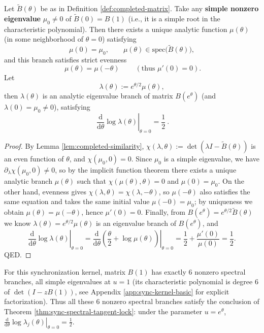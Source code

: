 \begin{theorem}[Spectral Tangent Lock: All Spectral Logarithmic Slopes at \texorpdfstring{$u=1$}{u=1} Are Identically \texorpdfstring{$1/2$}{1/2}]\label{thm:sync-spectral-tangent-lock}
Let \(\widetilde B(\theta)\) be as in Definition \ref{def:completed-matrix}.
Take any \textbf{simple nonzero eigenvalue} \(\mu_0\neq 0\) of \(\widetilde B(0)=B(1)\) (i.e., it is a simple root in the characteristic polynomial).
Then there exists a unique analytic function \(\mu(\theta)\) (in some neighborhood of \(\theta=0\)) satisfying
\[
\mu(0)=\mu_0,\qquad \mu(\theta)\in\mathrm{spec}\bigl(\widetilde B(\theta)\bigr),
\]
and this branch satisfies strict evenness
\[
\boxed{\ \mu(\theta)=\mu(-\theta)\ } \qquad(\text{thus } \mu'(0)=0).
\]
Let
\[
\lambda(\theta):=e^{\theta/2}\mu(\theta),
\]
then \(\lambda(\theta)\) is an analytic eigenvalue branch of matrix \(B(e^{\theta})\) (and \(\lambda(0)=\mu_0\neq 0\)), satisfying
\[
\boxed{\ \left.\frac{\mathrm{d}}{\mathrm{d}\theta}\log\lambda(\theta)\right|_{\theta=0}=\frac12\ }.
\]
\end{theorem}
\begin{proof}
By Lemma \ref{lem:completed-similarity}, \(\chi(\lambda,\theta):=\det(\lambda I-\widetilde B(\theta))\) is an even function of \(\theta\), and \(\chi(\mu_0,0)=0\).
Since \(\mu_0\) is a simple eigenvalue, we have \(\partial_\lambda\chi(\mu_0,0)\neq 0\), so by the implicit function theorem there exists a unique analytic branch \(\mu(\theta)\) such that \(\chi(\mu(\theta),\theta)=0\) and \(\mu(0)=\mu_0\).
On the other hand, evenness gives \(\chi(\lambda,\theta)=\chi(\lambda,-\theta)\), so \(\mu(-\theta)\) also satisfies the same equation and takes the same initial value \(\mu(-0)=\mu_0\); by uniqueness we obtain \(\mu(\theta)=\mu(-\theta)\), hence \(\mu'(0)=0\).
Finally, from \(B(e^\theta)=e^{\theta/2}\widetilde B(\theta)\) we know \(\lambda(\theta)=e^{\theta/2}\mu(\theta)\) is an eigenvalue branch of \(B(e^\theta)\), and
\[
\left.\frac{\mathrm{d}}{\mathrm{d}\theta}\log\lambda(\theta)\right|_{\theta=0}
=\left.\frac{\mathrm{d}}{\mathrm{d}\theta}\left(\frac{\theta}{2}+\log\mu(\theta)\right)\right|_{\theta=0}
=\frac12+\frac{\mu'(0)}{\mu(0)}
=\frac12.
\]
QED.
\end{proof}

\begin{corollary}[The 6 Nonzero Spectral Branches of the Synchronization Kernel Simultaneously Lock at \texorpdfstring{$u=1$}{u=1}]\label{cor:sync-spectral-tangent-lock-6}
For this synchronization kernel, matrix \(B(1)\) has exactly \(6\) nonzero spectral branches, all simple eigenvalues at \(u=1\) (its characteristic polynomial is degree \(6\) of \(\det(I-zB(1))\), see Appendix \ref{app:sync-kernel-basic} for explicit factorization).
Thus all these \(6\) nonzero spectral branches satisfy the conclusion of Theorem \ref{thm:sync-spectral-tangent-lock}:
under the parameter \(u=e^\theta\), \(\left.\frac{\mathrm{d}}{\mathrm{d}\theta}\log\lambda_j(\theta)\right|_{\theta=0}=\frac12\).
\end{corollary}

